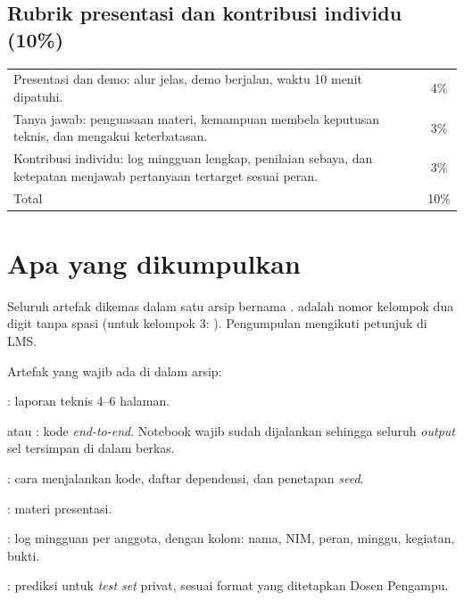 \documentclass[12pt, a4paper]{article}
\begin{document}
\subsection{Rubrik presentasi dan kontribusi individu (10\%)}

\renewcommand{\arraystretch}{1.35}
\begin{center}\small
\begin{tabular}{|L{9.4cm}|c|}
  \hline
   &  \\
  \hline
  Presentasi dan demo: alur jelas, demo berjalan, waktu 10 menit dipatuhi. & 4\% \\
  \hline
  Tanya jawab: penguasaan materi, kemampuan membela keputusan teknis, dan mengakui keterbatasan. & 3\% \\
  \hline
  Kontribusi individu: log mingguan lengkap, penilaian sebaya, dan ketepatan menjawab pertanyaan tertarget sesuai peran. & 3\% \\
  \hline
  Total & 10\% \\
  \hline
\end{tabular}
\end{center}

\section{Apa yang dikumpulkan}\label{sec:submit}

Seluruh artefak dikemas dalam satu arsip bernama .  adalah nomor kelompok dua digit tanpa spasi (untuk kelompok 3: ). Pengumpulan mengikuti petunjuk di LMS.

Artefak yang wajib ada di dalam arsip:

\begin{borderedsquare}
  \item {}: laporan teknis 4--6 halaman.
  \item {} atau : kode \emph{end-to-end}. Notebook wajib sudah dijalankan sehingga seluruh \emph{output} sel tersimpan di dalam berkas.
  \item {}: cara menjalankan kode, daftar dependensi, dan penetapan \emph{seed}.
  \item {}: materi presentasi.
  \item {}: log mingguan per anggota, dengan kolom: nama, NIM, peran, minggu, kegiatan, bukti.
  \item {}: prediksi untuk \emph{test set} privat, sesuai format yang ditetapkan Dosen Pengampu.
\end{borderedsquare}
\end{document}
